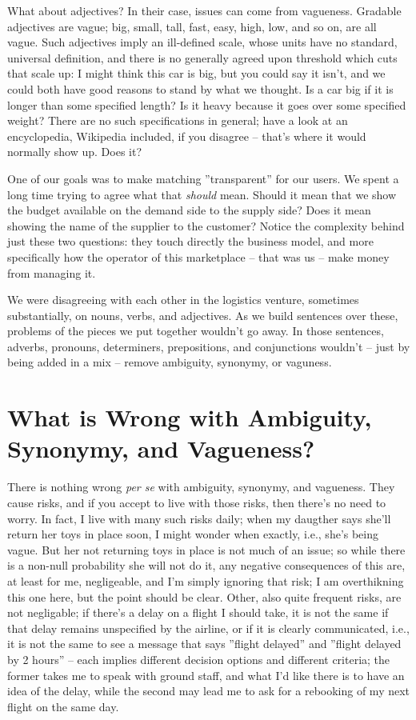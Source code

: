 \documentclass[graybox,envcountchap,sectrefs]{svmono}
\begin{document}
What about adjectives? In their case, issues can come from vagueness. Gradable adjectives are vague; big, small, tall, fast, easy, high, low, and so on, are all vague. Such adjectives imply an ill-defined scale, whose units have no standard, universal definition, and there is no generally agreed upon threshold which cuts that scale up: I might think this car is big, but you could say it isn't, and we could both have good reasons to stand by what we thought. Is a car big if it is longer than some specified length? Is it heavy because it goes over some specified weight? There are no such specifications in general; have a look at an encyclopedia, Wikipedia included, if you disagree -- that's where it would normally show up. Does it?

One of our goals was to make matching ''transparent'' for our users. We spent a long time trying to agree what that \textit{should} mean. Should it mean that we show the budget available on the demand side to the supply side? Does it mean showing the name of the supplier to the customer? Notice the complexity behind just these two questions: they touch directly the business model, and more specifically how the operator of this marketplace -- that was us -- make money from managing it.  

We were disagreeing with each other in the logistics venture, sometimes substantially, on nouns, verbs, and adjectives. As we build sentences over these, problems of the pieces we put together wouldn't go away. In those sentences, adverbs, pronouns, determiners, prepositions, and conjunctions wouldn't -- just by being added in a mix -- remove ambiguity, synonymy, or vaguness.


\section{What is Wrong with Ambiguity, Synonymy, and Vagueness?}
There is nothing wrong \textit{per se} with ambiguity, synonymy, and vagueness. They cause risks, and if you accept to live with those risks, then there's no need to worry. In fact, I live with many such risks daily; when my daugther says she'll return her toys in place soon, I might wonder when exactly, i.e., she's being vague. But her not returning toys in place is not much of an issue; so while there is a non-null probability she will not do it, any negative consequences of this are, at least for me, negligeable, and I'm simply ignoring that risk; I am overthikning this one here, but the point should be clear. Other, also quite frequent risks, are not negligable; if there's a delay on a flight I should take, it is not the same if that delay remains unspecified by the airline, or if it is clearly communicated, i.e., it is not the same to see a message that says ''flight delayed'' and ''flight delayed by 2 hours'' -- each implies different decision options and different criteria; the former takes me to speak with ground staff, and what I'd like there is to have an idea of the delay, while the second may lead me to ask for a rebooking of my next flight on the same day.
\end{document}
